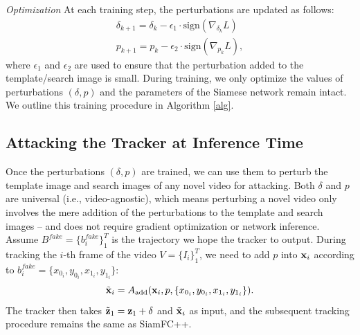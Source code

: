 \documentclass[journal]{IEEEtran}
\begin{document}
\textit{Optimization} At each training step, the perturbations are updated as follows:
\begin{gather}
\delta_{k+1} = \delta_{k} - \epsilon_1 \cdot \text{sign}(\nabla_{\delta_k}L)\\
p_{k+1} = p_{k} - \epsilon_2 \cdot \text{sign}(\nabla_{p_k}L),
\end{gather}
where $\epsilon_1$ and $\epsilon_2$ are used to ensure that the perturbation added to the template/search image is small.
During training, we only optimize the values of perturbations $(\delta, p)$ and the parameters of the Siamese network remain intact. We outline this training procedure in Algorithm \ref{alg}.

\subsection{Attacking the Tracker at Inference Time}

Once the perturbations $(\delta, p)$ are trained, we can use them to perturb the template image and search images of any novel video for attacking. Both $\delta$ and $p$ are universal (i.e., video-agnostic), which means perturbing a novel video only involves the mere addition of the perturbations to the template and search images -- and does not require gradient optimization or network inference.
Assume $B^{fake}=\{b^{fake}_i\}_1^{T}$ is the trajectory we hope the tracker to output.
During tracking the $i$-th frame of the video $V=\{I_i\}_1^T$, we need to add $p$ into $\textbf x_i$ according to $b^{fake}_i=\{x_{0_i}, y_{0_i}, x_{1_i}, y_{1_i}\}$:
\begin{equation}
\tilde{\textbf x}_i = A_{\text{add}}(\textbf x_i, p, \{x_{0_i}, y_{0_i}, x_{1_i}, y_{1_i}\}).
\end{equation}
The tracker then takes $\tilde{\textbf z}_1=\textbf z_1+\delta$ and $\tilde{ \textbf x}_i$ as input, and the subsequent tracking procedure remains the same as SiamFC++.
\end{document}
